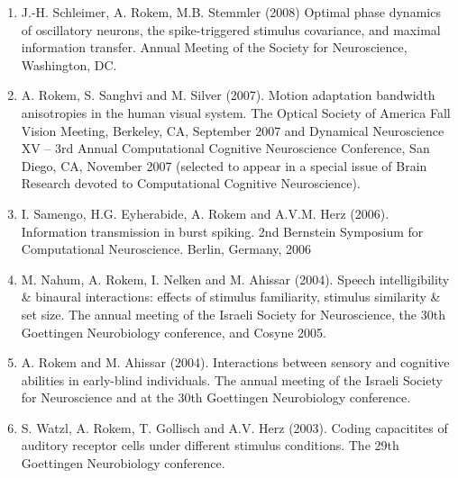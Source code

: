 \documentclass[11pt,fullpage]{article}
\begin{document}
\begin{enumerate}
\item J.-H. Schleimer, A. Rokem, M.B. Stemmler (2008) Optimal phase dynamics of oscillatory neurons, the spike-triggered stimulus covariance, and maximal information transfer. Annual Meeting of the Society for Neuroscience, Washington, DC.

\item A. Rokem, S. Sanghvi and M. Silver (2007). Motion adaptation bandwidth anisotropies in the human visual system. The Optical Society of America Fall Vision Meeting, Berkeley, CA, September 2007 and Dynamical Neuroscience XV – 3rd Annual Computational Cognitive Neuroscience Conference, San Diego, CA, November 2007 (selected to appear in a special issue of Brain Research devoted to Computational Cognitive Neuroscience).

\item I. Samengo, H.G. Eyherabide, A. Rokem and A.V.M. Herz (2006). Information transmission in burst spiking. 2nd Bernstein Symposium for Computational Neuroscience. Berlin, Germany, 2006

\item M. Nahum, A. Rokem, I. Nelken and M. Ahissar (2004). Speech intelligibility \& binaural interactions: effects of stimulus familiarity, stimulus similarity \& set size. The annual meeting of the Israeli Society for Neuroscience, the 30th Goettingen Neurobiology conference, and Cosyne 2005.

\item A. Rokem and M. Ahissar (2004). Interactions between sensory and cognitive abilities in early-blind individuals. The annual meeting of the Israeli Society for Neuroscience and at the 30th Goettingen Neurobiology conference.

\item S. Watzl, A. Rokem, T. Gollisch and A.V. Herz (2003). Coding capacitites of auditory receptor cells under different stimulus conditions. The 29th Goettingen Neurobiology conference.
\end{enumerate}
\end{document}

